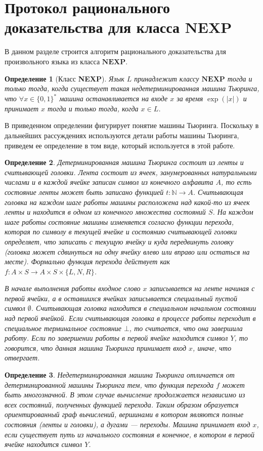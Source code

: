 \documentclass[14pt, a4paper]{extreport}
\newtheorem{definition}{\indent Определение}
\newcommand{\word}{\{0, 1\}^*}
\begin{document}
        \section{Протокол рационального доказательства для класса $\textbf{NEXP}$}
        В данном разделе строится алгоритм рационального доказательства для произвольного языка из класса $\textbf{NEXP}$.
        \begin{definition}[Класс \textbf{NEXP}]Язык $L$ принадлежит классу $\textbf{NEXP}$ тогда и только тогда, когда существует такая недетерминированная машина Тьюринга, что $\forall x \in \word$ машина останавливается на входе $x$ за время $\exp(|x|)$ и принимает $x$ тогда и только тогда, когда $x \in L$.
        \end{definition}
        В приведенном определении фигурирует понятие машины Тьюринга. Поскольку в дальнейших рассуждениях используются детали работы машины Тьюринга, приведем ее определение в том виде, который используется в этой работе.
        \begin{definition}Детерминированная машина Тьюринга состоит из ленты и считывающей головки. Лента состоит из ячеек, занумерованных натуральными числами и в каждой ячейке записан символ из конечного алфавита $A$, то есть состояние ленты может быть записано функцией $t: \mathbb{N} \longrightarrow A$. Считывающая головка на каждом шаге работы машины расположена над какой-то из ячеек ленты и находится в одном из конечного множества состояний $S$. На каждом шаге работы состояние машины изменяется согласно функции перехода, которая по символу в текущей ячейке и состоянию считывающей головки определяет, что записать с текущую ячейку и куда передвинуть головку (головка может сдвинуться на одну ячейку влево или вправо или остаться на месте). Формально функция перехода действует как $f: A \times S \longrightarrow A \times S \times \{L, N, R\}$.

            В начале выполнения работы входное слово $x$ записывается на ленте начиная с первой ячейки, а в оставшихся ячейках записывается специальный пустой символ $\emptyset$. Считывающая головка находится в специальном начальном состоянии над первой ячейкой. Если считывающая головка в процессе работы переходит в специальное терминальное состояние $\bot$, то считается, что она завершила работу. Если по завершении работы в первой ячейке находится символ $Y$, то говорится, что данная машина Тьюринга принимает вход $x$, иначе, что отвергает.
        \end{definition}
        \begin{definition}
            Недетерминированная машина Тьюринга отличается от детерминированной машины Тьюринга тем, что функция перехода $f$ может быть многозначной. В этом случае вычисление продолжается независимо из всех состояний, полученных функцией перехода. Таким образом образуется ориентированный граф вычислений, вершинами в котором являются полные состояния (ленты и головки), а дугами --- переходы. Машина принимает вход $x$, если существует путь из начального состояния в конечное, в котором в первой ячейке находится символ $Y$.
        \end{definition}
\end{document}
